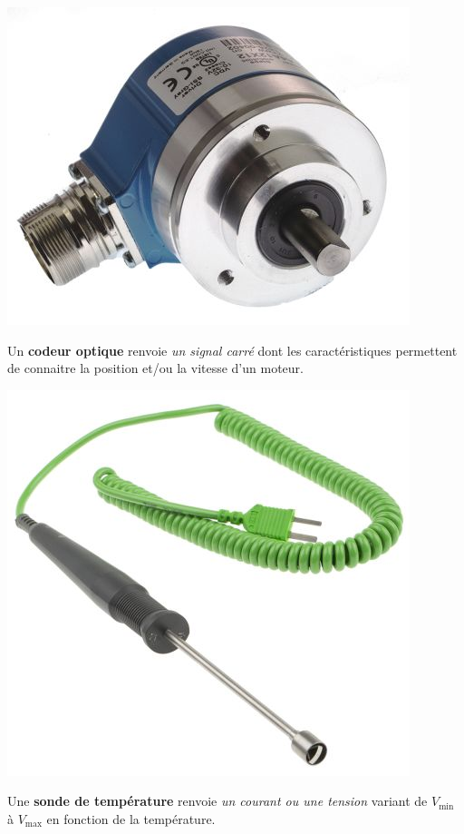 \begin{UPSTIactivite}

		\begin{minipage}[b]{.9\textwidth}
		\begin{center}
			\includegraphics[width=.2\textwidth,height=.3\textheight,keepaspectratio]{images/codeur_optique}
		\end{center}

			Un \textbf{codeur optique} renvoie \textit{un signal carré} dont les caractéristiques permettent de connaitre la position et/ou la vitesse d'un moteur.
		\end{minipage}



			\begin{minipage}[b]{.9\textwidth}
			\begin{center}
				\includegraphics[width=.2\textwidth,height=.3\textheight,keepaspectratio]{images/sondeTemperature}
			\end{center}

				Une \textbf{sonde de température} renvoie \textit{un courant ou une tension} variant de $V_{\text{min}}$ à  $V_{\text{max}}$ en fonction de la température.
			\end{minipage}


\end{UPSTIactivite}
